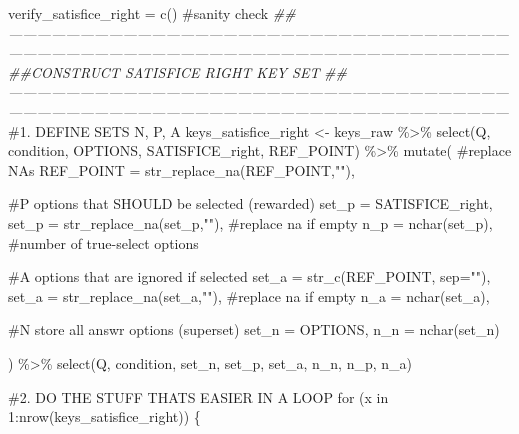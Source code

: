 \documentclass[
  letterpaper,
  DIV=11,
  numbers=noendperiod]{scrreprt}
\newenvironment{Shaded}{\begin{snugshade}}{\end{snugshade}}
\newcommand{\AttributeTok}[1]{\textcolor[rgb]{0.40,0.45,0.13}{#1}}
\newcommand{\CommentTok}[1]{\textcolor[rgb]{0.37,0.37,0.37}{#1}}
\newcommand{\ControlFlowTok}[1]{\textcolor[rgb]{0.00,0.23,0.31}{#1}}
\newcommand{\DecValTok}[1]{\textcolor[rgb]{0.68,0.00,0.00}{#1}}
\newcommand{\DocumentationTok}[1]{\textcolor[rgb]{0.37,0.37,0.37}{\textit{#1}}}
\newcommand{\FunctionTok}[1]{\textcolor[rgb]{0.28,0.35,0.67}{#1}}
\newcommand{\NormalTok}[1]{\textcolor[rgb]{0.00,0.23,0.31}{#1}}
\newcommand{\OtherTok}[1]{\textcolor[rgb]{0.00,0.23,0.31}{#1}}
\newcommand{\SpecialCharTok}[1]{\textcolor[rgb]{0.37,0.37,0.37}{#1}}
\newcommand{\StringTok}[1]{\textcolor[rgb]{0.13,0.47,0.30}{#1}}
\begin{document}
\begin{Shaded}
\begin{Highlighting}[]
\NormalTok{verify\_satisfice\_right }\OtherTok{=} \FunctionTok{c}\NormalTok{() }\CommentTok{\#sanity check}
\DocumentationTok{\#\#——————————————————————————————————————————————————————————————————————}
\DocumentationTok{\#\#CONSTRUCT SATISFICE RIGHT KEY SET}
\DocumentationTok{\#\#——————————————————————————————————————————————————————————————————————}
\CommentTok{\#1. DEFINE SETS N, P, A}
\NormalTok{keys\_satisfice\_right }\OtherTok{\textless{}{-}}\NormalTok{ keys\_raw }\SpecialCharTok{\%\textgreater{}\%} 
  \FunctionTok{select}\NormalTok{(Q, condition, OPTIONS, SATISFICE\_right, REF\_POINT) }\SpecialCharTok{\%\textgreater{}\%} 
  \FunctionTok{mutate}\NormalTok{(}
    \CommentTok{\#replace NAs}
    \AttributeTok{REF\_POINT =} \FunctionTok{str\_replace\_na}\NormalTok{(REF\_POINT,}\StringTok{""}\NormalTok{),}

    \CommentTok{\#P options that SHOULD be selected (rewarded)}
    \AttributeTok{set\_p =}\NormalTok{ SATISFICE\_right,}
    \AttributeTok{set\_p =} \FunctionTok{str\_replace\_na}\NormalTok{(set\_p,}\StringTok{""}\NormalTok{), }\CommentTok{\#replace na if empty}
    \AttributeTok{n\_p =} \FunctionTok{nchar}\NormalTok{(set\_p), }\CommentTok{\#number of true{-}select options}

    \CommentTok{\#A options that are ignored if selected}
    \AttributeTok{set\_a =} \FunctionTok{str\_c}\NormalTok{(REF\_POINT, }\AttributeTok{sep=}\StringTok{""}\NormalTok{),}
    \AttributeTok{set\_a =} \FunctionTok{str\_replace\_na}\NormalTok{(set\_a,}\StringTok{""}\NormalTok{), }\CommentTok{\#replace na if empty}
    \AttributeTok{n\_a =} \FunctionTok{nchar}\NormalTok{(set\_a),}

    \CommentTok{\#N store all answr options (superset)}
    \AttributeTok{set\_n =}\NormalTok{ OPTIONS,  }
    \AttributeTok{n\_n =} \FunctionTok{nchar}\NormalTok{(set\_n)}
  
\NormalTok{) }\SpecialCharTok{\%\textgreater{}\%} \FunctionTok{select}\NormalTok{(Q, condition, set\_n, set\_p, set\_a, n\_n, n\_p, n\_a)}

\CommentTok{\#2. DO THE STUFF THAT\textquotesingle{}S EASIER IN A LOOP}
\ControlFlowTok{for}\NormalTok{ (x }\ControlFlowTok{in} \DecValTok{1}\SpecialCharTok{:}\FunctionTok{nrow}\NormalTok{(keys\_satisfice\_right)) \{}
  

\end{Highlighting}
\end{Shaded}
\end{document}
